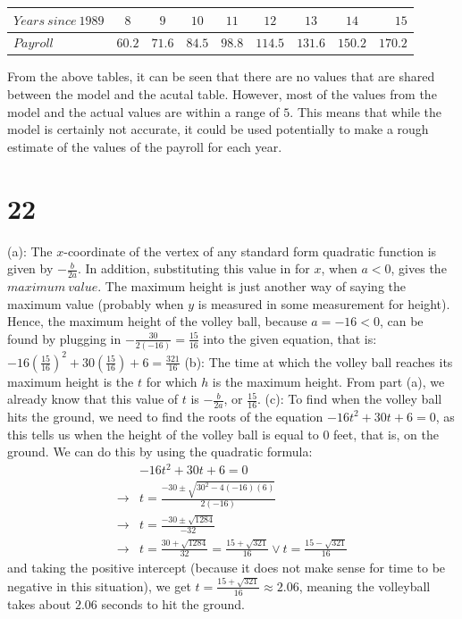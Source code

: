 \documentclass{article}
\theoremstyle{definition}
\begin{document}
\begin{table}[h!]
        \begin{center}
                \begin{tabular}{l|c|c|c|c|c|c|c|r}
                        $Years\ since\ 1989$ & $8$ & $9$ & $10$ & $11$ & $12$ & $13$ & $14$ & $15$\\
                        \hline
                        $Payroll$ & $60.2$ & $71.6$ & $84.5$ & $98.8$ & $114.5$ & $131.6$ & $150.2$ & $170.2$
                \end{tabular}
        \end{center}
\end{table}
\FloatBarrier
From the above tables, it can be seen that there are no values that are shared between the model 
and the acutal table. However, most of the values from the model and the actual values are within a range 
of $5$. This means that while the model is certainly not accurate, it could be used potentially to make 
a rough estimate of the values of the payroll for each year.

\section*{22}
(a): The $x$-coordinate of the vertex of any standard form quadratic function is given by $-\frac{b}{2a}$. In addition, substituting this value in for 
$x$, when $a<0$, gives the $maximum\ value$. The maximum height is just another way of saying the maximum value (probably when $y$ is measured in some 
measurement for height). Hence, the maximum height of the volley ball, because $a=-16<0$, can be found by plugging in $-\frac{30}{2(-16)}=\frac{15}{16}
$ into the given equation, that is:\newline 
$-16(\frac{15}{16})^2+30(\frac{15}{16})+6=\frac{321}{16}$\newline
(b): The time at which the volley ball reaches its maximum height is the $t$ for which $h$ is the maximum height. From part (a), we already know that 
this value of $t$ is $-\frac{b}{2a}$, or $\frac{15}{16}$.\newline
(c): To find when the volley ball hits the ground, we need to find the roots of the equation $-16t^2+30t+6=0$, as this tells us when the height of the 
volley ball is equal to $0$ feet, that is, on the ground. We can do this by using the quadratic formula:
\[
\begin{array}{rl}
            & -16t^2+30t+6=0 \\
\rightarrow & t=\frac{-30\pm\sqrt{30^2-4(-16)(6)}}{2(-16)} \\
\rightarrow & t=\frac{-30\pm\sqrt{1284}}{-32} \\
\rightarrow & t=\frac{30+\sqrt{1284}}{32}=\frac{15+\sqrt{321}}{16}\vee t=\frac{15-\sqrt{321}}{16}
\end{array}
\]
and taking the positive intercept (because it does not make sense 
for time to be negative in this situation), we get $t=\frac{15+\sqrt{321}}{16}\approx 2.06$, meaning the volleyball takes about $2.06$ seconds to hit 
the ground.
\end{document}
